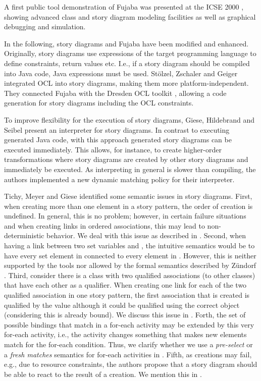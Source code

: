 A first public tool demonstration of Fujaba was presented at the ICSE 2000 \cite{NNZ00}, showing advanced class and story diagram modeling facilities as well as graphical debugging and simulation.

In the following, story diagrams and Fujaba have been modified and enhanced.
Originally, story diagrams use expressions of the target programming language to define constraints, return values etc.
I.e., if a story diagram should be compiled into Java code, Java expressions must be used.
St\"{o}lzel, Zschaler and Geiger \cite{SZG07} integrated OCL into story diagrams, making them more platform-independent.
They connected Fujaba with the Dresden OCL toolkit \cite{DresdenOCL}, allowing a code generation for story diagrams including the OCL constraints.

To improve flexibility for the execution of story diagrams, Giese, Hildebrand and Seibel \cite{GHS09} present an interpreter for story diagrams.
In contrast to executing generated Java code, with this approach generated story diagrams can be executed immediately.
This allows, for instance, to create higher-order transformations where story diagrams are created by other story diagrams and immediately be executed.
As interpreting in general is slower than compiling, the authors implemented a new dynamic matching policy for their interpreter.

Tichy, Meyer and Giese \cite{TMG06} identified some semantic issues in story diagrams.
First, when creating more than one element in a story pattern, the order of creation is undefined.
In general, this is no problem; however, in certain failure situations and when creating links in ordered associations, this may lead to non-deterministic behavior.
We deal with this issue as described in .
Second, when having a link between two set variables  and , the intuitive semantics would be to have every set element in  connected to every element in  .
However, this is neither supported by the tools nor allowed by the formal semantics described by Z\"{u}ndorf \cite{Zun01}.
Third, consider there is a class with two qualified associations (to other classes) that have each other as a qualifier.
When creating one link for each of the two qualified association in one story pattern, the first association that is created is qualified by the  value although it could be qualified using the correct object (considering this is already bound).
We discuss this issue in .
Forth, the set of possible bindings that match in a for-each activity may be extended by this very for-each activity, i.e., the activity changes something that makes new elements match for the for-each condition.
Thus, we clarify whether we use a \emph{pre-select} or a \emph{fresh matches} semantics for for-each activities in .
Fifth, as creations may fail, e.g., due to resource constraints, the authors propose that a story diagram should be able to react to the result of a creation.
We mention this in .

